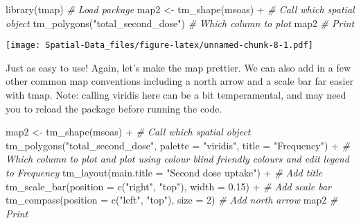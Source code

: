 \documentclass[
]{book}
\newenvironment{Shaded}{\begin{snugshade}}{\end{snugshade}}
\newcommand{\AttributeTok}[1]{\textcolor[rgb]{0.77,0.63,0.00}{#1}}
\newcommand{\CommentTok}[1]{\textcolor[rgb]{0.56,0.35,0.01}{\textit{#1}}}
\newcommand{\DecValTok}[1]{\textcolor[rgb]{0.00,0.00,0.81}{#1}}
\newcommand{\FloatTok}[1]{\textcolor[rgb]{0.00,0.00,0.81}{#1}}
\newcommand{\FunctionTok}[1]{\textcolor[rgb]{0.00,0.00,0.00}{#1}}
\newcommand{\NormalTok}[1]{#1}
\newcommand{\OtherTok}[1]{\textcolor[rgb]{0.56,0.35,0.01}{#1}}
\newcommand{\SpecialCharTok}[1]{\textcolor[rgb]{0.00,0.00,0.00}{#1}}
\newcommand{\StringTok}[1]{\textcolor[rgb]{0.31,0.60,0.02}{#1}}
\begin{document}
\begin{Shaded}
\begin{Highlighting}[]
\FunctionTok{library}\NormalTok{(tmap) }\CommentTok{\# Load package}
\NormalTok{map2 }\OtherTok{\textless{}{-}} \FunctionTok{tm\_shape}\NormalTok{(msoas) }\SpecialCharTok{+} \CommentTok{\# Call which spatial object}
          \FunctionTok{tm\_polygons}\NormalTok{(}\StringTok{"total\_second\_dose"}\NormalTok{) }\CommentTok{\# Which column to plot}
\NormalTok{map2 }\CommentTok{\# Print}
\end{Highlighting}
\end{Shaded}

\texttt{[image: Spatial-Data\_files/figure-latex/unnamed-chunk-8-1.pdf]}

Just as easy to use! Again, let's make the map prettier. We can also add in a few other common map conventions including a north arrow and a scale bar far easier with tmap. Note: calling viridis here can be a bit temperamental, and may need you to reload the package before running the code.

\begin{Shaded}
\begin{Highlighting}[]
\NormalTok{map2 }\OtherTok{\textless{}{-}} \FunctionTok{tm\_shape}\NormalTok{(msoas) }\SpecialCharTok{+} \CommentTok{\# Call which spatial object}
          \FunctionTok{tm\_polygons}\NormalTok{(}\StringTok{"total\_second\_dose"}\NormalTok{, }\AttributeTok{palette =} \StringTok{"viridis"}\NormalTok{, }\AttributeTok{title =} \StringTok{"Frequency"}\NormalTok{) }\SpecialCharTok{+} \CommentTok{\# Which column to plot and plot using colour blind friendly colours and edit legend to \textquotesingle{}Frequency\textquotesingle{}}
          \FunctionTok{tm\_layout}\NormalTok{(}\AttributeTok{main.title =} \StringTok{"Second dose uptake"}\NormalTok{) }\SpecialCharTok{+} \CommentTok{\# Add title}
          \FunctionTok{tm\_scale\_bar}\NormalTok{(}\AttributeTok{position =} \FunctionTok{c}\NormalTok{(}\StringTok{"right"}\NormalTok{, }\StringTok{"top"}\NormalTok{), }\AttributeTok{width =} \FloatTok{0.15}\NormalTok{) }\SpecialCharTok{+} \CommentTok{\# Add scale bar}
          \FunctionTok{tm\_compass}\NormalTok{(}\AttributeTok{position =} \FunctionTok{c}\NormalTok{(}\StringTok{"left"}\NormalTok{, }\StringTok{"top"}\NormalTok{), }\AttributeTok{size =} \DecValTok{2}\NormalTok{) }\CommentTok{\# Add north arrow}
\NormalTok{map2 }\CommentTok{\# Print}
\end{Highlighting}
\end{Shaded}
\end{document}

